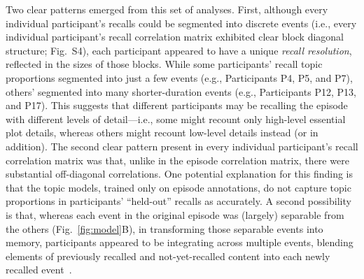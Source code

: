 \documentclass[10pt]{article}
\newcommand{\corrmats}{S4}
\begin{document}
Two clear patterns emerged from this set of analyses.  First, although every individual participant's recalls could be segmented into discrete events (i.e., every individual participant's recall correlation matrix exhibited clear block diagonal structure; Fig.~\corrmats), each participant appeared to have a unique \textit{recall resolution}, reflected in the sizes of those blocks.  While some participants' recall topic proportions segmented into just a few events (e.g., Participants P4, P5, and P7), others' segmented into many shorter-duration events (e.g., Participants P12, P13, and P17).  This suggests that different participants may be recalling the episode with different levels of detail---i.e., some might recount only high-level essential plot details, whereas others might recount low-level details instead (or in addition).  The second clear pattern present in every individual participant's recall correlation matrix was that, unlike in the episode correlation matrix, there were substantial off-diagonal correlations.  One potential explanation for this finding is that the topic models, trained only on episode annotations, do not capture topic proportions in participants' ``held-out'' recalls as accurately.  A second possibility is that, whereas each event in the original episode was (largely) separable from the others (Fig.~\ref{fig:model}B), in transforming those separable events into memory, participants appeared to be integrating across multiple events, blending elements of previously recalled and not-yet-recalled content into each newly recalled event~\citep[Figs.~\ref{fig:model}E, \corrmats; also see][]{MannEtal11, HowaEtal12, Mann19}.
\end{document}
